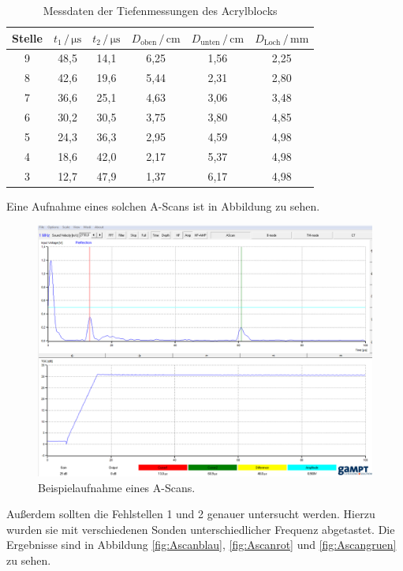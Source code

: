 \begin{table}
\centering
\caption{Messdaten der Tiefenmessungen des Acrylblocks}
\label{tab:mess2}
\begin{tabular}{c c c c c c}
\toprule
Stelle & $t_1 \,/\, \si{\micro\second}$ & $t_2 \,/\, \si{\micro\second}$ &$D_\text{oben} \,/\, \si{\centi\meter}$&$D_\text{unten} \,/\, \si{\centi\meter}$ & $D_\text{Loch} \,/\, \si{\milli\meter}$\\
\midrule 
9 & 48,5 & 14,1 & 6,25 & 1,56 & 2,25 \\
8 & 42,6 & 19,6 & 5,44 & 2,31 & 2,80\\
7 & 36,6 & 25,1 & 4,63 & 3,06 & 3,48\\
6 & 30,2 & 30,5 & 3,75 & 3,80 & 4,85\\
5 & 24,3 & 36,3 & 2,95 & 4,59 & 4,98\\
4 & 18,6 & 42,0 & 2,17 & 5,37 & 4,98\\
3 & 12,7 & 47,9 & 1,37 & 6,17 & 4,98\\
\bottomrule
\end{tabular}
\end{table}

Eine Aufnahme eines solchen A-Scans ist in Abbildung  zu sehen. 

\begin{figure}
  \centering
  \includegraphics[scale=0.3]{content/Ascan.PNG}
  \caption{Beispielaufnahme eines A-Scans.}
  \label{fig:Ascan}
\end{figure}

Außerdem sollten die Fehlstellen 1 und 2 genauer untersucht werden. Hierzu wurden sie mit verschiedenen 
Sonden unterschiedlicher Frequenz abgetastet. Die Ergebnisse sind in Abbildung \ref{fig:Ascanblau},
\ref{fig:Ascanrot} und \ref{fig:Ascangruen} zu sehen.

